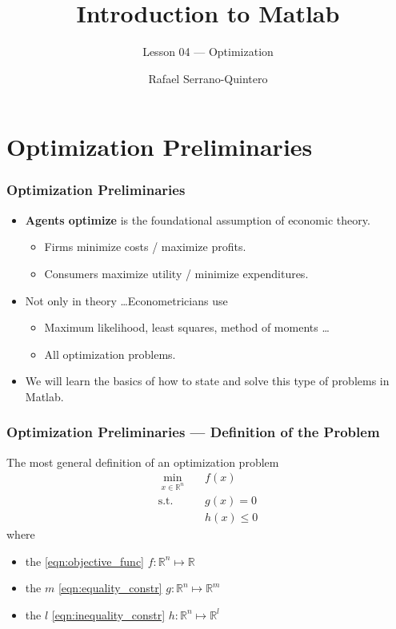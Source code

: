 \documentclass[11pt,xcolor={svgnames},aspectratio=169,usepdftitle=false]{beamer}
\title{Introduction to Matlab}
\subtitle{Lesson 04 --- Optimization}
\author{Rafael Serrano-Quintero}
\institute{Department of Economics \\ University of Barcelona}
\date{}
\begin{document}
\VerbatimFootnotes

\maketitle

\section{Optimization Preliminaries}

\begin{frame}
  \frametitle{Optimization Preliminaries}
\begin{itemize}
  \item \alert{\textbf{Agents optimize}} is the foundational assumption of economic theory.
  \begin{itemize}
    \item Firms minimize costs / maximize profits.
    \item Consumers maximize utility / minimize expenditures.
  \end{itemize}
  \item Not only in theory \ldots Econometricians use
  \begin{itemize}
    \item Maximum likelihood, least squares, method of moments \ldots
    \item All optimization problems.
  \end{itemize}
  \item We will learn the basics of how to state and solve this type of problems in Matlab.
\end{itemize}
\end{frame}

\begin{frame}
  \frametitle{Optimization Preliminaries --- Definition of the Problem}
The most general definition of an optimization problem
\begin{align}
  \underset{x\in\mathbb{R}^n}{\min} \phantom{\Omega} &   f(x) \tag{Objective Function} \label{eqn:objective_func} \\
  \text{s.t. } & g(x) = 0 \tag{Equality Constraints} \label{eqn:equality_constr} \\
  \phantom{\text{s.t.}} & h(x) \leq 0 \tag{Inequality Constraints} \label{eqn:inequality_constr}
\end{align}
where
\begin{itemize}
  \item the \ref{eqn:objective_func} $f :\mathbb{R}^n\mapsto \mathbb{R}$
  \item the $m$ \ref{eqn:equality_constr} $g :\mathbb{R}^n\mapsto \mathbb{R}^m$
  \item the $l$ \ref{eqn:inequality_constr} $h :\mathbb{R}^n\mapsto \mathbb{R}^l$
\end{itemize}
\end{frame}
\end{document}
